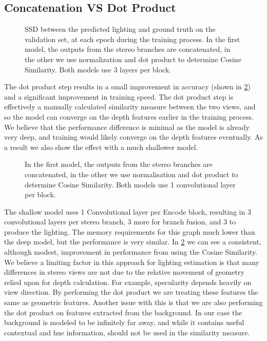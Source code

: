 \documentclass[ %
                    author={Gavin Parker},
                supervisor={Dr. Neill Campbell},
                    degree={MEng},
                     title={Deep Learning for Illumination Estimation from Stereo Images},
                  subtitle={},
                      type={Research},
                      year={2018} ]{dissertation}
\begin{document}
\subsection{Concatenation VS Dot Product}
\begin{figure}[H]
\setlength\figureheight{6cm}
\setlength\figurewidth{12cm}
\centering

\caption{SSD between the predicted lighting and ground truth on the validation set, at each epoch during the training process. In the first model, the outputs from the stereo branches are concatenated, in the other we use normalization and dot product to determine Cosine Similarity. Both models use 3 layers per block.}
\label{fig:dotprod_comp}
\end{figure}
The dot product step results in a small improvement in accuracy (shown in \ref{fig:dotprod_comp}) and a significant improvement in training speed. The dot product step is effectively a manually calculated similarity measure between the two views, and so the model can converge on the depth features earlier in the training process. We believe that the performance difference is minimal as the model is already very deep, and training would likely converge on the depth features eventually.
As a result we also show the effect with a much shallower model.
\begin{figure}[H]
\setlength\figureheight{6cm}
\setlength\figurewidth{12cm}
\centering

\caption{In the first model, the outputs from the stereo branches are concatenated, in the other we use normalisation and dot product to determine Cosine Similarity. Both models use 1 convolutional layer per block.}
\label{fig:dotprod_comp}
\end{figure}
The shallow model uses 1 Convolutional layer per Encode block, resulting in 3 convolutional layers per stereo branch, 3 more for branch fusion, and 3 to produce the lighting. The memory requirements for this graph much lower than the deep model, but the performance is very similar. In \ref{fig:dotprod_comp} we can see a consistent, although modest, improvement in performance from using the Cosine Similarity. We believe a limiting factor in this approach for lighting estimation is that many differences in stereo views are not due to the relative movement of geometry relied upon for depth calculation. For example, specularity depends heavily on view direction. By performing the dot product we are treating these features the same as geometric features.
\newline
Another issue with this is that we are also performing the dot product on features extracted from the background. In our case the background is modeled to be infinitely far away, and while it contains useful contextual and hue information, should not be used in the similarity measure.
\end{document}
